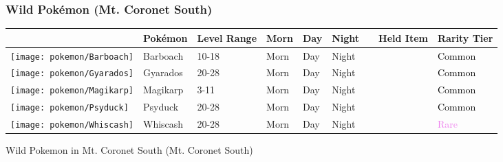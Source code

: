 \subsubsection{Wild Pokémon (Mt. Coronet South)}%
\label{ssubsec:WildPokmon(Mt.CoronetSouth)}%
\begin{longtable}{||l l l l l l l l l||}%
\hline%
&Pokémon&Level Range&Morn&Day&Night&&Held Item&Rarity Tier\\%
\hline%
\endhead%
\hline%
\texttt{[image: pokemon/Barboach]}&Barboach&10{-}18&Morn&Day&Night&&&\textcolor{black}{%
Common%
}\\%
\hline%
\texttt{[image: pokemon/Gyarados]}&Gyarados&20{-}28&Morn&Day&Night&&&\textcolor{black}{%
Common%
}\\%
\hline%
\texttt{[image: pokemon/Magikarp]}&Magikarp&3{-}11&Morn&Day&Night&&&\textcolor{black}{%
Common%
}\\%
\hline%
\texttt{[image: pokemon/Psyduck]}&Psyduck&20{-}28&Morn&Day&Night&&&\textcolor{black}{%
Common%
}\\%
\hline%
\texttt{[image: pokemon/Whiscash]}&Whiscash&20{-}28&Morn&Day&Night&&&\textcolor{violet}{%
Rare%
}\\%
\hline%
\end{longtable}%
\caption{Wild Pokemon in Mt. Coronet South (Mt. Coronet South)}